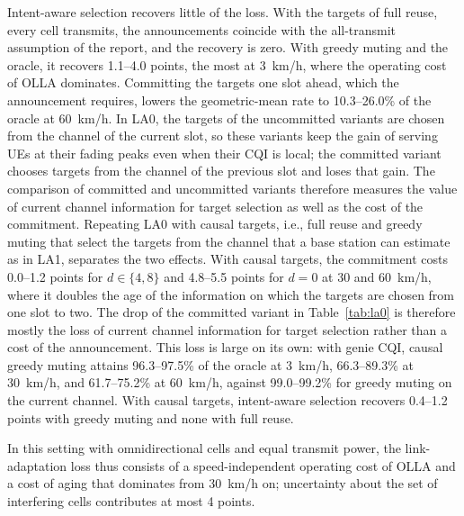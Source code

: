 \documentclass{ieeeaccess}
\begin{document}
Intent-aware selection recovers little of the loss. With the targets of full reuse, every cell transmits, the announcements coincide with the all-transmit assumption of the report, and the recovery is zero. With greedy muting and the oracle, it recovers 1.1--4.0 points, the most at 3~km/h, where the operating cost of OLLA dominates. Committing the targets one slot ahead, which the announcement requires, lowers the geometric-mean rate to 10.3--26.0\% of the oracle at 60~km/h. In LA0, the targets of the uncommitted variants are chosen from the channel of the current slot, so these variants keep the gain of serving UEs at their fading peaks even when their CQI is local; the committed variant chooses targets from the channel of the previous slot and loses that gain. The comparison of committed and uncommitted variants therefore measures the value of current channel information for target selection as well as the cost of the commitment. Repeating LA0 with causal targets, i.e., full reuse and greedy muting that select the targets from the channel that a base station can estimate as in LA1, separates the two effects. With causal targets, the commitment costs 0.0--1.2 points for $d \in \{4, 8\}$ and 4.8--5.5 points for $d = 0$ at 30 and 60~km/h, where it doubles the age of the information on which the targets are chosen from one slot to two. The drop of the committed variant in Table~\ref{tab:la0} is therefore mostly the loss of current channel information for target selection rather than a cost of the announcement. This loss is large on its own: with genie CQI, causal greedy muting attains 96.3--97.5\% of the oracle at 3~km/h, 66.3--89.3\% at 30~km/h, and 61.7--75.2\% at 60~km/h, against 99.0--99.2\% for greedy muting on the current channel. With causal targets, intent-aware selection recovers 0.4--1.2 points with greedy muting and none with full reuse.

In this setting with omnidirectional cells and equal transmit power, the link-adaptation loss thus consists of a speed-independent operating cost of OLLA and a cost of aging that dominates from 30~km/h on; uncertainty about the set of interfering cells contributes at most 4 points.
\end{document}
